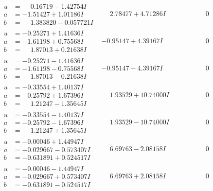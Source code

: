 \documentclass[1p]{elsarticle_modified}
\theoremstyle{definition}
\begin{document}
$$\begin{array}{c|c|c}
\begin{aligned}
u &= \phantom{-}0.16719 - 1.42754 I \\
a &= -1.51427 + 1.01186 I \\
b &= \phantom{-}1.383820 - 0.057721 I\end{aligned}
 & \phantom{-}2.78477 + 4.71286 I & \phantom{-0.000000 } 0 \\ \hline\begin{aligned}
u &= -0.25271 + 1.41636 I \\
a &= -1.61198 + 0.75568 I \\
b &= \phantom{-}1.87013 + 0.21638 I\end{aligned}
 & -0.95147 + 4.39167 I & \phantom{-0.000000 } 0 \\ \hline\begin{aligned}
u &= -0.25271 - 1.41636 I \\
a &= -1.61198 - 0.75568 I \\
b &= \phantom{-}1.87013 - 0.21638 I\end{aligned}
 & -0.95147 - 4.39167 I & \phantom{-0.000000 } 0 \\ \hline\begin{aligned}
u &= -0.33554 + 1.40137 I \\
a &= -0.25792 + 1.67396 I \\
b &= \phantom{-}1.21247 - 1.35645 I\end{aligned}
 & \phantom{-}1.93529 + 10.74000 I & \phantom{-0.000000 } 0 \\ \hline\begin{aligned}
u &= -0.33554 - 1.40137 I \\
a &= -0.25792 - 1.67396 I \\
b &= \phantom{-}1.21247 + 1.35645 I\end{aligned}
 & \phantom{-}1.93529 - 10.74000 I & \phantom{-0.000000 } 0 \\ \hline\begin{aligned}
u &= -0.00046 + 1.44947 I \\
a &= -0.029667 - 0.573407 I \\
b &= -0.631891 + 0.524517 I\end{aligned}
 & \phantom{-}6.69763 - 2.08158 I & \phantom{-0.000000 } 0 \\ \hline\begin{aligned}
u &= -0.00046 - 1.44947 I \\
a &= -0.029667 + 0.573407 I \\
b &= -0.631891 - 0.524517 I\end{aligned}
 & \phantom{-}6.69763 + 2.08158 I & \phantom{-0.000000 } 0\\

\end{array}$$
\end{document}
